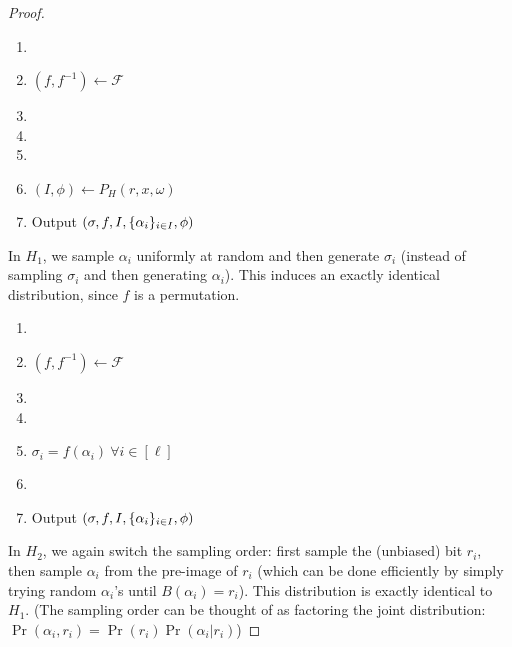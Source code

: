 \begin{proof}
\begin{enumerate}
    \item \DIFaddbegin {}
    \item \DIFaddend $(f, f^{-1}) \gets \mathcal{F}$
    \item \DIFdelbegin %
\DIFdelend \DIFaddbegin {}
    \DIFaddend \item {}
    \item \DIFdelbegin {}%
\item%
\DIFdelend $(I, \phi) \gets P_H(r, x, \omega)$
    \item Output $(\sigma, f, I, \{\alpha_i\}_{i \in I}, \phi)$
\end{enumerate}
In $H_1$, we sample $\alpha_i$ uniformly at random and then generate $\sigma_i$ (instead of
sampling $\sigma_i$ and then generating $\alpha_i$). This induces an exactly identical distribution, since $f$
is a permutation.

\begin{enumerate}
    \item \DIFaddbegin {}\item \DIFaddend $(f, f^{-1}) \gets \mathcal{F}$
    \item \DIFdelbegin %
\DIFdelend \DIFaddbegin {}
    \DIFaddend \item {}
    \item $\sigma_i = f(\alpha_i) ~\forall i \in [\ell]$
    \item \DIFdelbegin {}%
\item%
\DIFdelend Output $(\sigma, f, I, \{\alpha_i\}_{i \in I}, \phi)$
\end{enumerate}
In $H_2$, we again switch the sampling order: first sample the (unbiased) bit
$r_i$, then sample $\alpha_i$ from the pre-image of $r_i$ (which can be done efficiently
by simply trying random $\alpha_i$'s until $B(\alpha_i) = r_i$).
This distribution is exactly identical to $H_1$.
(The sampling order can be thought of as factoring the joint distribution:
$\Pr(\alpha_i, r_i) = \Pr(r_i)\Pr(\alpha_i | r_i)$)


\end{proof}
